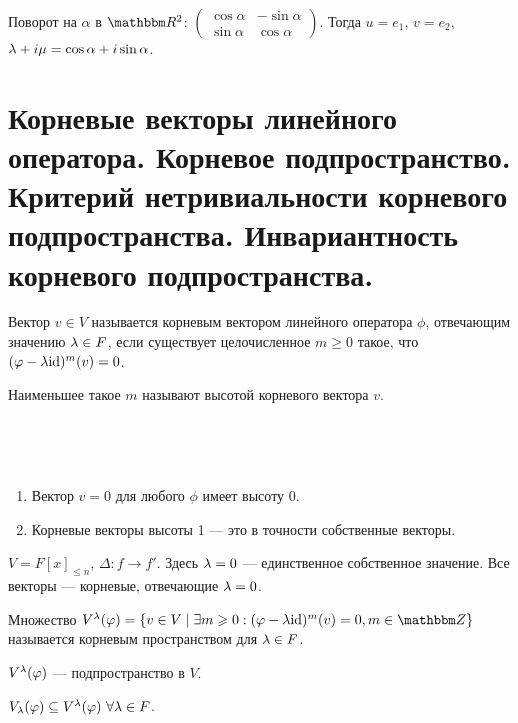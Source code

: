 \begin{Examples}
Поворот на $\alpha$ в $\R^2$: $
\begin{pmatrix}
\cos \alpha & -\sin \alpha \\
\sin \alpha & \cos \alpha  
\end{pmatrix}
$. Тогда $u = e_1$, $v = e_2$, $\lambda + i\mu = \cos \alpha + i\sin \alpha$.
\end{Examples}

\section{Корневые векторы линейного оператора. Корневое подпространство. Критерий нетривиальности корневого подпространства. Инвариантность корневого подпространства.}

\begin{Def}
Вектор $v \in V$ называется корневым вектором линейного оператора $\phi$, отвечающим значению $\lambda \in F$, если существует целочисленное $m \geqslant 0$ такое, что $(\varphi - \lambda\mathrm{id})^m(v) = 0$.

Наименьшее такое $m$ называют высотой корневого вектора $v$.
\end{Def}
\ \\
\begin{Comment}\
\begin{enumerate}
\item Вектор $v = 0$ для любого $\phi$ имеет высоту 0.
\item Корневые векторы высоты 1 --- это в точности собственные векторы.
\end{enumerate}
\end{Comment}

\begin{Examples}
$V = F[x]_{\leqslant n}$, $\Delta: f \rightarrow f'$. Здесь $\lambda = 0$ --- единственное собственное значение. Все векторы --- корневые, отвечающие $\lambda = 0$. 
\end{Examples}

\begin{Def}
Множество $V^\l(\phi) = \{ v \in V \mid \exists m \geqslant 0  : (\phi - \l\id)^m(v) = 0, m \in \mathbb Z \}$ называется корневым пространством для $\lambda \in F$.
\end{Def}

\begin{Task}
$V^\lambda(\varphi)$ --- подпространство в $V$.
\end{Task}

\begin{Comment}
$V_\lambda(\varphi) \subseteq V^\lambda(\varphi) \ \forall \lambda \in F$.
\end{Comment}

